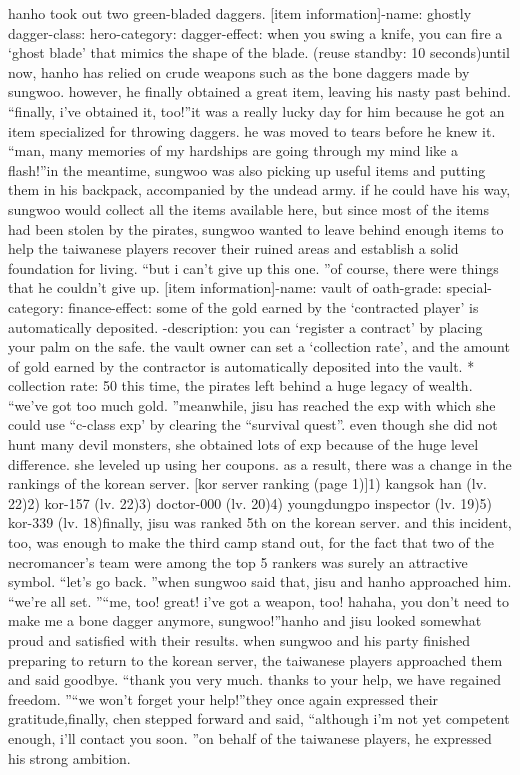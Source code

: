 hanho took out two green-bladed daggers.
[item information]-name: ghostly dagger-class: hero-category: dagger-effect: when you swing a knife, you can fire a ‘ghost blade’ that mimics the shape of the blade.
 (reuse standby: 10 seconds)until now, hanho has relied on crude weapons such as the bone daggers made by sungwoo.
 however, he finally obtained a great item, leaving his nasty past behind.
“finally, i’ve obtained it, too!”it was a really lucky day for him because he got an item specialized for throwing daggers.
he was moved to tears before he knew it.
“man, many memories of my hardships are going through my mind like a flash!”in the meantime, sungwoo was also picking up useful items and putting them in his backpack, accompanied by the undead army.
if he could have his way, sungwoo would collect all the items available here, but since most of the items had been stolen by the pirates, sungwoo wanted to leave behind enough items to help the taiwanese players recover their ruined areas and establish a solid foundation for living.
 “but i can’t give up this one.
”of course, there were things that he couldn’t give up.
[item information]-name: vault of oath-grade: special-category: finance-effect: some of the gold earned by the ‘contracted player’ is automatically deposited.
-description: you can ‘register a contract’ by placing your palm on the safe.
 the vault owner can set a ‘collection rate’, and the amount of gold earned by the contractor is automatically deposited into the vault.
* collection rate: 50%
 this time, the pirates left behind a huge legacy of wealth.
“we’ve got too much gold.
”meanwhile, jisu has reached the exp with which she could use “c-class exp’ by clearing the “survival quest”.
even though she did not hunt many devil monsters, she obtained lots of exp because of the huge level difference.
 she leveled up using her coupons.
as a result, there was a change in the rankings of the korean server.
[kor server ranking (page 1)]1) kangsok han (lv.
 22)2) kor-157 (lv.
 22)3) doctor-000 (lv.
 20)4) youngdungpo inspector (lv.
 19)5) kor-339 (lv.
 18)finally, jisu was ranked 5th on the korean server.
 and this incident, too, was enough to make the third camp stand out, for the fact that two of the necromancer’s team were among the top 5 rankers was surely an attractive symbol.
“let’s go back.
”when sungwoo said that, jisu and hanho approached him.
“we’re all set.
”“me, too! great! i’ve got a weapon, too! hahaha, you don’t need to make me a bone dagger anymore, sungwoo!”hanho and jisu looked somewhat proud and satisfied with their results.
when sungwoo and his party finished preparing to return to the korean server, the taiwanese players approached them and said goodbye.
“thank you very much.
 thanks to your help, we have regained freedom.
”“we won’t forget your help!”they once again expressed their gratitude,finally, chen stepped forward and said, “although i’m not yet competent enough, i’ll contact you soon.
”on behalf of the taiwanese players, he expressed his strong ambition.


